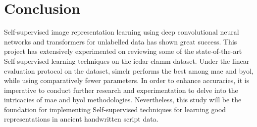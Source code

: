 \chapter{Conclusion}

Self-supervised image representation learning using deep convolutional neural networks and transformers for unlabelled data has shown great success. This project has extensively experimented on reviewing some of the state-of-the-art Self-supervised learning techniques on the \gls{icdar} \gls{clamm} dataset. Under the linear evaluation protocol on the dataset, \gls{simclr} performs the best among \gls{mae} and \gls{byol}, while using comparatively fewer parameters. In order to enhance accuracies, it is imperative to conduct further research and experimentation to delve into the intricacies of \gls{mae} and \gls{byol} methodologies. Nevertheless, this study will be the foundation for implementing Self-supervised techniques for learning good representations in ancient handwritten script data.